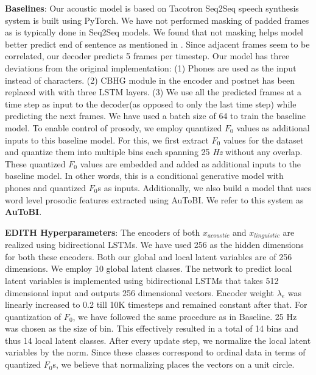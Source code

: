 \textbf{Baselines}: Our acoustic model is based on Tacotron\cite{tacotron_original} Seq2Seq speech synthesis system is built using PyTorch\citep{pytorch}. We have not performed masking of padded frames as is typically done in Seq2Seq models. We found that not masking helps model better predict end of sentence as mentioned in \cite{tacotron_original}. Since adjacent frames seem to be correlated, our decoder predicts 5 frames per timestep. Our model has three deviations from the original implementation: (1) Phones are used as the input instead of characters. (2) CBHG module in the encoder and postnet has been replaced with with three LSTM layers. (3) We use all the predicted frames at a time step as input to the decoder(as opposed to only the last time step) while predicting the next frames.  We have used a batch size of 64 to train the baseline model. To enable control of prosody, we employ quantized $F_0$ values as additional inputs to this baseline model. For this, we first extract $F_0$ values for the dataset and quantize them into multiple bins each spanning 25 \textit{Hz} without any overlap. These quantized $F_0$ values are embedded and added as additional inputs to the baseline model. In other words, this is a conditional generative model with phones and quantized $F_0$s as inputs. Additionally, we also build a model that uses word level prosodic features extracted using AuToBI\citep{rosenberg2010autobi}. We refer to this system as \textbf{AuToBI}.

\textbf{EDITH Hyperparameters}: The encoders of both $x_{acoustic}$ and $x_{linguistic}$ are realized using bidirectional LSTMs. We have used 256 as the hidden dimensions for both these encoders. Both our global and local latent variables are of 256 dimensions. We employ 10 global latent classes. The network to predict local latent variables is implemented using bidirectional LSTMs that takes 512 dimensional input and outputs 256 dimensional vectors. Encoder weight $\lambda_e$ was linearly increased to 0.2 till 10K timesteps and remained constant after that. For quantization of $F_0$, we have followed the same procedure as in Baseline. 25 Hz was chosen as the size of bin. This effectively resulted in a total of 14 bins and thus 14 local latent classes. After every update step, we normalize the local latent variables by the norm. Since these classes correspond to ordinal data in terms of quantized $F_0$s, we believe that normalizing places the vectors on a unit circle.

